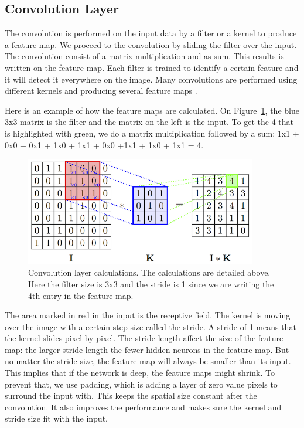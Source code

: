 \subsection{Convolution Layer}

The convolution is performed on the input data by a filter or a kernel to produce a feature map. We proceed to the convolution by sliding the filter over the input. The convolution consist of a matrix multiplication and as sum. This results is written on the feature map. Each filter is trained to identify a certain feature and it will detect it everywhere on the image.  Many convolutions are performed using different kernels and producing several feature maps \cite{nnbook}.

Here is an example of how the feature maps are calculated. On Figure~\ref{fig:convo_calc}, the blue 3x3 matrix is the filter and the matrix on the left is the input. To get the 4 that is highlighted with green, we do a matrix multiplication followed by a sum: 1x1 + 0x0 + 0x1 + 1x0 + 1x1 + 0x0 +1x1 + 1x0 + 1x1 = 4. 
	\begin{figure}[!htp]
    \centering
        \includegraphics[width=0.9\textwidth]{figures/02-conv_layer}
        \caption[Convolution calculations]{Convolution layer calculations. The calculations are detailed above. Here the filter size is 3x3 and the stride is 1 since we are writing the 4th entry in the feature map.}\label{fig:convo_calc}
    \end{figure}
    
The area marked  in  red in the input is the receptive field. The kernel is moving over the image with a certain step size called the stride. A stride of 1 means that the kernel slides pixel by pixel. The stride length affect the size of the feature map: the larger stride length the fewer hidden neurons in the feature map. But no matter the stride size, the feature map will always be smaller than its input. This implies that if the network is deep, the feature maps might shrink. To prevent that, we use padding, which is adding a layer of zero value pixels to surround the input with. This keeps the spatial size constant after the convolution. It also improves the performance and makes sure the kernel and stride size fit with the input. 

